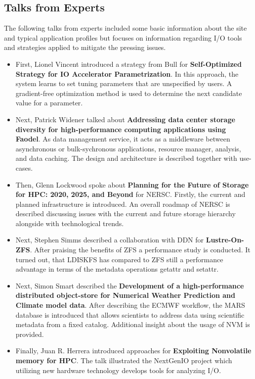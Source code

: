 \documentclass{llncs}
\begin{document}
\subsection{Talks from Experts}

The following talks from experts included some basic information about the site and typical application profiles but focuses on information regarding I/O tools and strategies applied to mitigate the pressing issues.

\begin{itemize}
\item First, Lionel Vincent introduced a strategy from Bull for \textbf{Self-Optimized Strategy for IO Accelerator Parametrization}.
In this approach, the system learns to set tuning parameters that are unspecified by users.
A gradient-free optimization method is used to determine the next candidate value for a parameter.

\item Next, Patrick Widener talked about \textbf{Addressing data center storage diversity for high-performance computing applications using Faodel}.
As data management service, it acts as a middleware between asynchronous or bulk-sychronous applications, resource manager, analysis, and data caching.
The design and architecture is described together with use-cases.

\item Then, Glenn Lockwood spoke about \textbf{Planning for the Future of Storage for HPC: 2020, 2025, and Beyond} for NERSC.
Firstly, the current and planned infrastructure is introduced.
An overall roadmap of NERSC is described discussing issues with the current and future storage hierarchy alongside with technological trends.


\item Next, Stephen Simms described a collaboration with DDN for  \textbf{Lustre-On-ZFS}.
After praising the benefits of ZFS a performance study is conducted.
It turned out, that LDISKFS has compared to ZFS still a performance advantage in terms of the metadata operations getattr and setattr.


\item Next, Simon Smart described the \textbf{Development of a high-performance distributed object-store for Numerical Weather Prediction and Climate model data}.
After describing the ECMWF workflow, the MARS database is introduced that allows scientists to address data using scientific metadata from a fixed catalog.
Additional insight about the usage of NVM is provided.

\item Finally, Juan R. Herrera introduced approaches for \textbf{Exploiting Nonvolatile memory for HPC}. The talk illustrated the NextGenIO project which utilizing new hardware technology develops tools for analyzing I/O.
\end{itemize}
\end{document}
